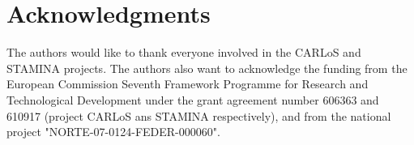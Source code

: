 \section*{Acknowledgments}\label{sec:acknowledgments}

The authors would like to thank everyone involved in the CARLoS and STAMINA projects.
The authors also want to acknowledge the funding from the European Commission Seventh Framework Programme for Research and Technological Development under the grant agreement number 606363 and 610917 (project CARLoS ans STAMINA respectively), and from the national project "NORTE-07-0124-FEDER-000060".